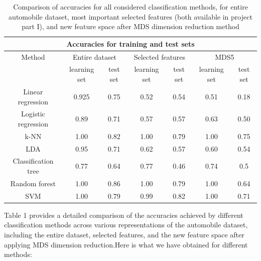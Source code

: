 \documentclass[11pt,a4paper]{article}\usepackage[]{graphicx}\usepackage[]{xcolor}
\begin{document}
	 	\begin{table}[h!]\label{tab:classification_comparison}
	 		\centering
	 		\caption{Comparison of accuracies for all considered classification methods, for entire automobile dataset, most important selected features (both available in project part I), and new feature space after MDS dimension reduction method}
	 		\begin{tabular}{|c||c|c||c|c||c|c|}
	 			\hline
	 			\multicolumn{7}{|c|}{Accuracies for training and test sets}\\\hline
	 			Method & \multicolumn{2}{c||}{Entire dataset} & \multicolumn{2}{c||}{Selected features} & \multicolumn{2}{c|}{MDS5}\\\hline
	 			& learning set & test set & learning set & test set& learning set & test set\\\hline
	 			Linear regression & 0.925 & 0.75 & 0.52 & 0.54 & 0.51 & 0.18 \\\hline
	 			Logistic regression & 0.89 & 0.71 & 0.57 & 0.57 & 0.63 & 0.50 \\\hline
	 			k-NN & 1.00 & 0.82 & 1.00 & 0.79 & 1.00 & 0.75 \\\hline
	 			LDA & 0.95 & 0.71 & 0.62 & 0.57 & 0.60 & 0.54 \\\hline
	 			Classification tree & 0.77 & 0.64 & 0.77 & 0.46 & 0.74 & 0.5\\\hline
	 			Random forest & 1.00 & 0.86 & 1.00 & 0.79 & 1.00 & 0.64\\\hline
	 			SVM & 1.00 & 0.79 & 0.99 & 0.82 & 1.00 & 0.71 \\\hline
	 		\end{tabular}
	 	\end{table}
 Table 1 provides a detailed comparison of the accuracies achieved by different classification methods across various representations of the automobile dataset, including the entire dataset, selected features, and the new feature space after applying MDS dimension reduction.Here is what we have obtained for different methods:
\end{document}
